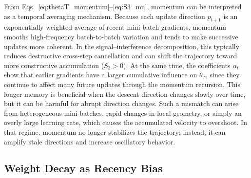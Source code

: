 From Eqs.~\eqref{eq:thetaT_momentum}--\eqref{eq:S3_mu}, momentum can be interpreted as a temporal averaging mechanism. Because each update direction \(p_{t+1}\) is an exponentially weighted average of recent mini-batch gradients, momentum smooths high-frequency batch-to-batch variation and tends to make successive updates more coherent. In the signal--interference decomposition, this typically reduces destructive cross-step cancellation and can shift the trajectory toward more constructive accumulation (\(S_3 > 0\)). At the same time, the coefficients \(\alpha_t\) show that earlier gradients have a larger cumulative influence on \(\theta_T\), since they continue to affect many future updates through the momentum recursion. This longer memory is beneficial when the descent direction changes slowly over time, but it can be harmful for abrupt direction changes. Such a mismatch can arise from heterogeneous mini-batches, rapid changes in local geometry, or simply an overly large learning rate, which causes the accumulated velocity to overshoot. In that regime, momentum no longer stabilizes the trajectory; instead, it can amplify stale directions and increase oscillatory behavior.

\subsection{Weight Decay as Recency Bias}
\label{subsec:weight_decay_method}

